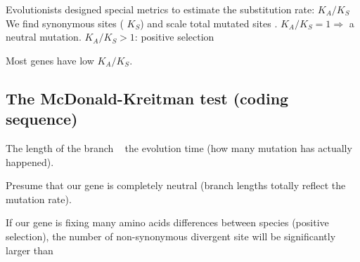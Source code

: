 \documentclass[main.tex]{subfiles}
\begin{document}
Evolutionists designed special metrics to estimate the substitution rate: $ K_A / K_S $ %
We find synonymous sites ( $ K_S $) and scale total mutated sites .
$ K_A / K_S = 1 \Rightarrow $ a neutral mutation.
$ K_A / K_S > 1 $: positive selection

Most genes have low $ K_A / K_S $.

\subsection{The McDonald-Kreitman test (coding sequence)}

The length of the branch ~ the evolution time (how many mutation has actually happened).

Presume that our gene is completely neutral (branch lengths totally reflect the mutation rate).

If our gene is fixing many amino acids differences between species (positive selection), the number of non-synonymous divergent site will be significantly larger than 
\end{document}
